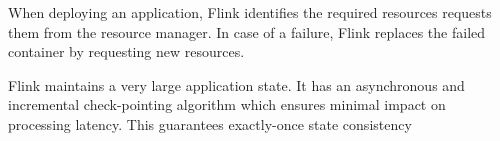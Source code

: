 When deploying an application, Flink identifies the required resources requests them from the resource manager. In case of a failure, Flink replaces the failed container by requesting new resources. 

Flink maintains a very large application state. It has an asynchronous and incremental check-pointing algorithm which ensures minimal impact on processing latency. 
This guarantees exactly-once state consistency

